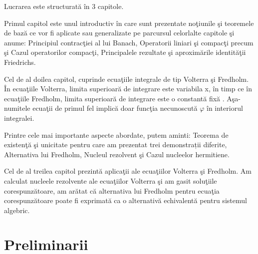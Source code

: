 \documentclass[a4paper,12pt,oneside]{report}
\begin{document}
Lucrarea este structurată în 3 capitole. 

Primul capitol este unul introductiv \^{i}n care sunt prezentate no\c{t}iunile \c{s}i teoremele de baz\u{a} ce vor fi aplicate sau generalizate pe parcursul celorlalte capitole \c{s}i anume: Principiul contrac\c{t}iei al lui Banach, Operatorii liniari \c{s}i compac\c{t}i precum \c{s}i Cazul operatorilor compac\c{t}i, Principalele rezultate \c{s}i aproxim\u{a}rile identit\u{a}\c{t}ii Friedrichs.

Cel de al doilea capitol, cuprinde ecua\c{t}iile integrale de tip Volterra \c{s}i Fredholm. \^{I}n ecua\c{t}iile Volterra, limita superioar\u{a} de integrare este variabila x, \^{i}n timp ce \^{i}n ecua\c{t}iile Fredholm, limita superioar\u{a} de integrare este o constant\u{a} fix\u{a} . A\c{s}a-numitele ecua\c{t}ii de primul fel implic\u{a} doar func\c{t}ia necunoscut\u{a} \(\varphi \) \^{i}n interiorul integralei.

Printre cele mai importante aspecte abordate, putem aminti: Teorema de existen\c{t}\u{a} \c{s}i unicitate pentru care am prezentat trei demonstrații diferite, Alternativa lui Fredholm, Nucleul rezolvent \c{s}i Cazul nucleelor hermitiene.

Cel de al treilea capitol prezint\u{a} aplica\c{t}ii ale ecua\c{t}iilor Volterra \c{s}i Fredholm. Am calculat nucleele rezolvente ale ecua\c{t}iilor Volterra \c{s}i am gasit solu\c{t}iile corespunz\u{a}toare, am ar\u{a}tat c\u{a} alternativa lui Fredholm pentru ecua\c{t}ia corespunz\u{a}toare poate fi exprimat\u{a} ca o alternativ\u{a} echivalent\u{a} pentru  sistemul algebric.



%
%
%
%

\chapter{Preliminarii}

\nocite{morosanu}
\nocite{kreyszig}
\end{document}
